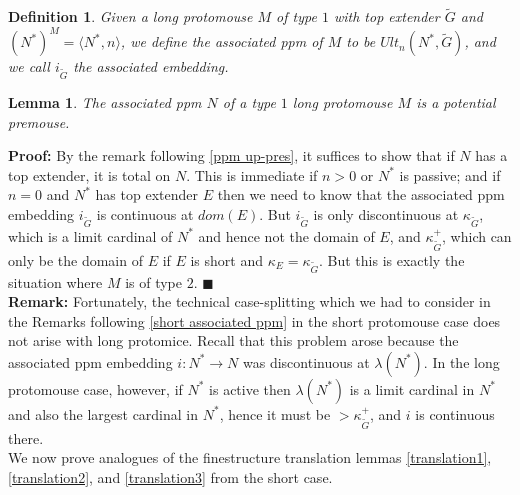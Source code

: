 \documentclass[12pt]{article}
\newtheorem{lem}[thm]{Lemma}
\newtheorem{defn}[thm]{Definition}
\begin{document}
\begin{defn} \label{long associated ppm}
Given a long protomouse $M$ of type $1$ with top extender $\tilde{G}$ and $(N^*)^M = \langle N^* , n \rangle$, we define the associated ppm of $M$ to be $Ult_n (N^* , \tilde{G} )$, and we call $i_{\tilde{G}}$ the associated embedding.
\end{defn}

\begin{lem}
The associated ppm $N$ of a type $1$ long protomouse $M$ is a potential premouse.
\end{lem}

\textbf{Proof:}  By the remark following \ref{ppm up-pres}, it suffices to show that if $N$ has a top extender, it is total on $N$.  This is immediate if $n > 0$ or $N^*$ is passive; and if $n = 0$ and $N^*$ has top extender $E$ then we need to know that the associated ppm embedding $i_{\tilde{G}}$ is continuous at $dom(E)$.  But $i_{\tilde{G}}$ is only discontinuous at $\kappa_{\tilde{G}}$, which is a limit cardinal of $N^*$ and hence not the domain of $E$, and $\kappa_{\tilde{G}}^+$, which can only be the domain of $E$ if $E$ is short and $\kappa_E = \kappa_{\tilde{G}}$.  But this is exactly the situation where $M$ is of type $2$. $\blacksquare$\\




\textbf{Remark:} Fortunately, the technical case-splitting which we had to consider in the Remarks following \ref{short associated ppm} in the short protomouse case does not arise with long protomice.  Recall that this problem arose because the associated ppm embedding $i: N^* \longrightarrow N$ was discontinuous at $\lambda (N^*)$.  In the long protomouse case, however, if $N^*$ is active then $\lambda (N^*)$ is a limit cardinal in $N^*$ and also the largest cardinal in $N^*$, hence it must be $> \kappa_{\tilde{G}}^+$, and $i$ is continuous there.\\


We now prove analogues of the finestructure translation lemmas \ref{translation1}, \ref{translation2}, and \ref{translation3} from the short case.
\end{document}
